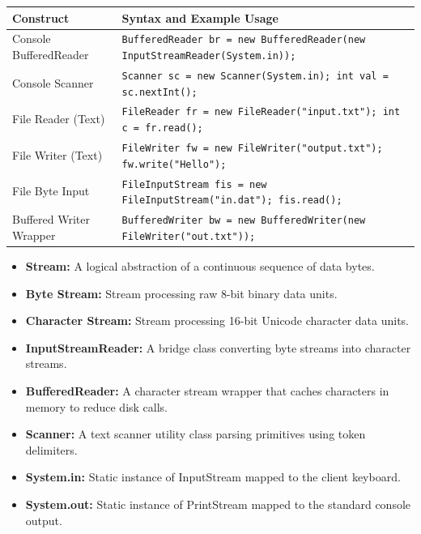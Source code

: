 \documentclass[12pt,a4paper]{article}
\renewcommand{\arraystretch}{1.45}
\begin{document}
\begin{tcolorbox}[formulabox, title={\textbf{Java I/O Stream Syntax}}]
{\renewcommand{\arraystretch}{1.3}%
\begin{tabularx}{\linewidth}{l Y}
\textbf{Construct} & \textbf{Syntax and Example Usage} \\
\hline
Console BufferedReader & \texttt{BufferedReader br = new BufferedReader(new InputStreamReader(System.in));} \\
Console Scanner & \texttt{Scanner sc = new Scanner(System.in); int val = sc.nextInt();} \\
File Reader (Text) & \texttt{FileReader fr = new FileReader("input.txt"); int c = fr.read();} \\
File Writer (Text) & \texttt{FileWriter fw = new FileWriter("output.txt"); fw.write("Hello");} \\
File Byte Input & \texttt{FileInputStream fis = new FileInputStream("in.dat"); fis.read();} \\
Buffered Writer Wrapper & \texttt{BufferedWriter bw = new BufferedWriter(new FileWriter("out.txt"));} \\
\end{tabularx}}
\end{tcolorbox}

\begin{tcolorbox}[defbox, title={\textbf{One-Line Definitions}}]
\begin{itemize}[leftmargin=*, itemsep=2pt]
  \item \textbf{Stream:} A logical abstraction of a continuous sequence of data bytes.
  \item \textbf{Byte Stream:} Stream processing raw 8-bit binary data units.
  \item \textbf{Character Stream:} Stream processing 16-bit Unicode character data units.
  \item \textbf{InputStreamReader:} A bridge class converting byte streams into character streams.
  \item \textbf{BufferedReader:} A character stream wrapper that caches characters in memory to reduce disk calls.
  \item \textbf{Scanner:} A text scanner utility class parsing primitives using token delimiters.
  \item \textbf{System.in:} Static instance of InputStream mapped to the client keyboard.
  \item \textbf{System.out:} Static instance of PrintStream mapped to the standard console output.
\end{itemize}
\end{tcolorbox}
\end{document}
